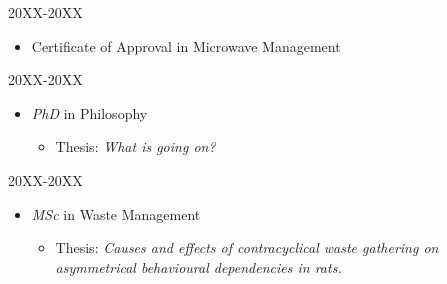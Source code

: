 





\begin{timeline}
	\item \subtitle{Practical U}
	\hfill 20XX-20XX
	\begin{itemize}[leftmargin=7mm, labelsep=2mm, itemsep=2mm, parsep=0mm]
		\item[\lline{olofblue}] Certificate of Approval in Microwave Management
	\end{itemize}

	\item \subtitle{Big U}
	\hfill 20XX-20XX
	\begin{itemize}[leftmargin=7mm, labelsep=2mm, itemsep=2mm, parsep=0mm]
		\item[\lline{olofblue}] {\textit{PhD}} in Philosophy
		\begin{itemize}
			\item[] Thesis: \textit{What is going on?}
		\end{itemize}
	\end{itemize}

	\item \subtitle{City U}
	\hfill 20XX-20XX
	\begin{itemize}[leftmargin=7mm, labelsep=2mm, itemsep=2mm, parsep=0mm]
		\item[\lline{olofblue}] {\textit{MSc}} in Waste Management
		\begin{itemize}
			\item[] Thesis: \textit{Causes and effects of contracyclical waste gathering on \\asymmetrical behavioural dependencies in rats.}
		\end{itemize}
	\end{itemize}
\end{timeline}
